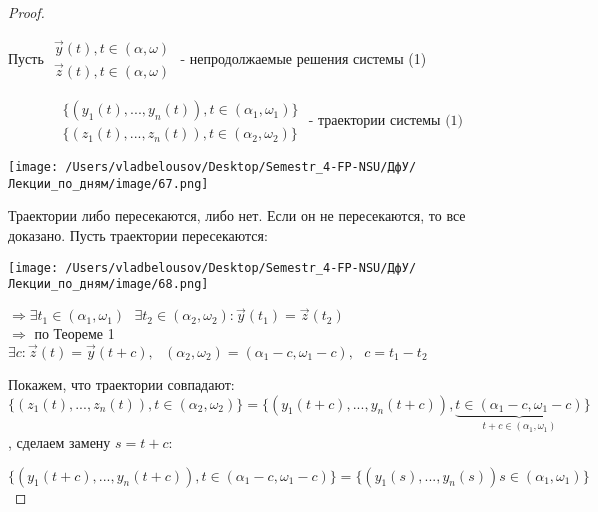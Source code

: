 \documentclass[12pt, a4paper]{report}
\begin{document}
\begin{proof} \(  \) 

    Пусть \( \begin{aligned}
        \vec{y } (t ) , t \in  (\alpha , \omega ) \\ 
        \vec{ z }  (t ) , t \in  (\alpha , \omega ) 
    \end{aligned}  \) - непродолжаемые  решения системы (1) 

    \[ \begin{aligned}
    \{(y_1 (t ) , ...,y_n(t )), t \in (\alpha_1 , \omega_1 )     \} \\
    \{(z_1 (t ) , ...,z_n (t )), t \in (\alpha_2 , \omega_2 )\}
    \end{aligned}\text{ - траектории системы (1)}  \] 

    \begin{center}
        \texttt{[image: /Users/vladbelousov/Desktop/Semestr\_4-FP-NSU/ДфУ/Лекции\_по\_дням/image/67.png]}
    \end{center}

    Траектории либо пересекаются, либо нет. Если он не пересекаются, то все доказано. Пусть траектории пересекаются: 

    \begin{center}
        \texttt{[image: /Users/vladbelousov/Desktop/Semestr\_4-FP-NSU/ДфУ/Лекции\_по\_дням/image/68.png]}
    \end{center}

    \( \Rightarrow \exists  t_1 \in  (\alpha_1 , \omega_1 ) \text{ }  \exists  t_2 \in (\alpha_2 , \omega_2 ) : \vec{y} (t_1 )= \vec{z }  (t_2) \) \\

    \(  \Rightarrow \) по Теореме 1 \( \exists c : \vec{ z } (t ) = \vec{ y} (t + c ) , \text{ }  (\alpha_2 , \omega_2 ) = (\alpha_1  - c , \omega_1 - c ) , \text{ }  c = t_1 -t_2 \) 

    Покажем, что траектории совпадают: 
    \[ \{(z_1(t) , ..., z_n(t )) , t \in  (\alpha_2 , \omega_2 )   \} = \{(y_1 (t +c ) ,..., y_n(t +c )), \underbrace{t \in  (\alpha_1 - c , \omega_1 - c )}_{t +c \in  (\alpha_1 , \omega_1)}\} \] 
    , сделаем замену \( s = t +c  \): 

    \[ \{(y_1 (t +c ) ,..., y_n(t +c )), t \in  (\alpha_1 - c , \omega_1 - c )\}=\{(y_1(s ), ...,y_n(s )) s \in (\alpha_1 , \omega_1)\} \] 
    
\end{proof}
\end{document}
